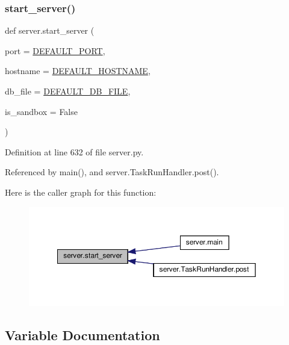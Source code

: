 \subsubsection{\texorpdfstring{start\+\_\+server()}{start\_server()}}
{\footnotesize\ttfamily def server.\+start\+\_\+server (\begin{DoxyParamCaption}\item[{}]{port = {\ttfamily \hyperlink{namespaceserver_a799b32fdd2321df0f6d93809c1aca14a}{D\+E\+F\+A\+U\+L\+T\+\_\+\+P\+O\+RT}},  }\item[{}]{hostname = {\ttfamily \hyperlink{namespaceserver_a0ea5dfe17186557ed34035da16619aa6}{D\+E\+F\+A\+U\+L\+T\+\_\+\+H\+O\+S\+T\+N\+A\+ME}},  }\item[{}]{db\+\_\+file = {\ttfamily \hyperlink{namespaceserver_a4d969e2880bb5b39591808aa7992ba7f}{D\+E\+F\+A\+U\+L\+T\+\_\+\+D\+B\+\_\+\+F\+I\+LE}},  }\item[{}]{is\+\_\+sandbox = {\ttfamily False} }\end{DoxyParamCaption})}



Definition at line 632 of file server.\+py.



Referenced by main(), and server.\+Task\+Run\+Handler.\+post().

Here is the caller graph for this function\+:
\nopagebreak
\begin{figure}[H]
\begin{center}
\leavevmode
\includegraphics[width=350pt]{namespaceserver_a16739378649273e6ea462b460262a854_icgraph}
\end{center}
\end{figure}


\subsection{Variable Documentation}
\mbox{\label{namespaceserver_a4d969e2880bb5b39591808aa7992ba7f}} 
